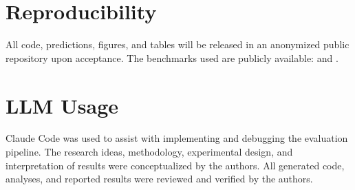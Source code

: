 \documentclass[pmlr]{jmlr}%
\begin{document}
\section{Reproducibility}\label{app:repro}
All code, predictions, figures, and tables will be released in an anonymized public repository upon
acceptance. The benchmarks used are publicly available:  and
.

\section{LLM Usage}\label{app:llm}
Claude Code was used to assist with implementing and debugging the evaluation pipeline. The research
ideas, methodology, experimental design, and interpretation of results were conceptualized by the
authors. All generated code, analyses, and reported results were reviewed and verified by the
authors.
\end{document}

